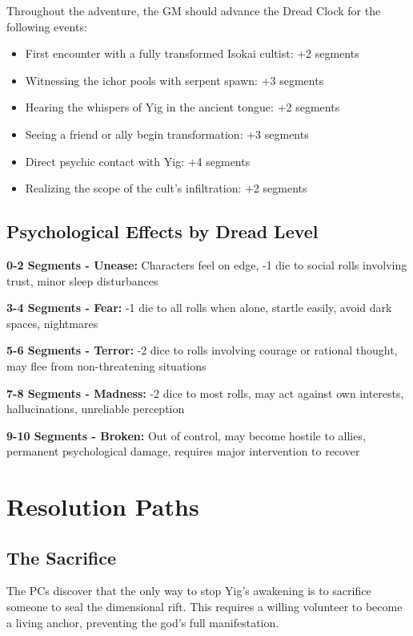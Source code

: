 \documentclass[12pt,twoside]{article}
\begin{document}
Throughout the adventure, the GM should advance the Dread Clock for the following events:

\begin{itemize}
  \item First encounter with a fully transformed Isokai cultist: +2 segments
  \item Witnessing the ichor pools with serpent spawn: +3 segments
  \item Hearing the whispers of Yig in the ancient tongue: +2 segments
  \item Seeing a friend or ally begin transformation: +3 segments
  \item Direct psychic contact with Yig: +4 segments
  \item Realizing the scope of the cult's infiltration: +2 segments
\end{itemize}

\subsection{Psychological Effects by Dread Level}

\textbf{0-2 Segments - Unease:} Characters feel on edge, -1 die to social rolls involving trust, minor sleep disturbances

\textbf{3-4 Segments - Fear:} -1 die to all rolls when alone, startle easily, avoid dark spaces, nightmares

\textbf{5-6 Segments - Terror:} -2 dice to rolls involving courage or rational thought, may flee from non-threatening situations

\textbf{7-8 Segments - Madness:} -2 dice to most rolls, may act against own interests, hallucinations, unreliable perception

\textbf{9-10 Segments - Broken:} Out of control, may become hostile to allies, permanent psychological damage, requires major intervention to recover

\section{Resolution Paths}

\subsection{The Sacrifice}

The PCs discover that the only way to stop Yig's awakening is to sacrifice someone to seal the dimensional rift. This requires a willing volunteer to become a living anchor, preventing the god's full manifestation.
\end{document}
